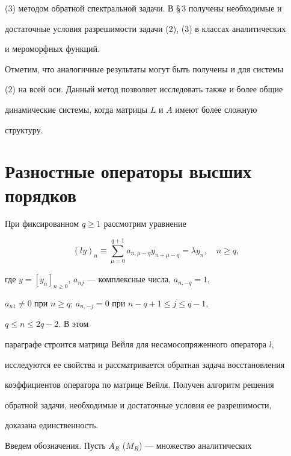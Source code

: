 (3) методом обратной спектральной задачи. В \S\,3 получены необходимые и 


достаточные условия разрешимости задачи (2), (3) в классах аналитических 


и мероморфных функций. 


 


Отметим, что аналогичные результаты могут быть получены и для системы 


(2) на всей оси. Данный метод позволяет исследовать также и более общие 


динамические системы, когда матрицы $L$ и $A$ имеют более сложную 


структуру. 


 


\section{Разностные операторы высших порядков} 


 


При фиксированном $q\ge 1$ рассмотрим уравнение 


\begin{equation} 


(ly)_n\equiv\sum^{q+1}_{\mu=0}a_{n,\mu-q} 


y_{n+\mu-q}=\lambda y_n,\quad n\ge q, 


\end{equation} 


где $y=[y_n]_{n\ge 0}$, $a_{nj}$ --- комплексные числа, $a_{n,-q}=1$, 


$a_{n1}\ne 0$ при $n\ge q$; $a_{n,-j}=0$ при $n-q+1\le j\le q-1$, 


$q\le n\le 2q-2$. В этом 


параграфе строится матрица Вейля для несамосопряженного оператора $l$, 


исследуются ее свойства и рассматривается обратная задача восстановления 


коэффициентов оператора по матрице Вейля. Получен алгоритм решения 


обратной задачи, необходимые и достаточные условия ее разрешимости, 


доказана единственность.  


 


Введем обозначения. Пусть $A_R$ ($M_R$) --- множество аналитических 


